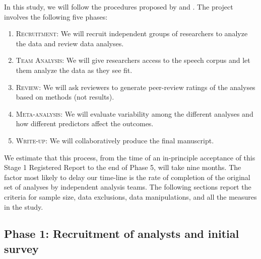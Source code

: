 \documentclass[Review,times,sageh]{sagej}
\providecommand{\tightlist}{\setlength{\itemsep}{0pt}\setlength{\parskip}{0pt}}
\begin{document}
In this study, we will follow the procedures proposed by \citet{Parker2020} and \citet{aczel2021}.
The project involves the following five phases:

\begin{enumerate}
\def\labelenumi{\arabic{enumi}.}
\tightlist
\item
  \textsc{Recruitment}: We will recruit independent groups of researchers to analyze the data and review data analyses.
\item
  \textsc{Team Analysis}: We will give researchers access to the speech corpus and let them analyze the data as they see fit.
\item
  \textsc{Review}: We will ask reviewers to generate peer-review ratings of the analyses based on methods (not results).
\item
  \textsc{Meta-analysis}: We will evaluate variability among the different analyses and how different predictors affect the outcomes.
\item
  \textsc{Write-up}: We will collaboratively produce the final manuscript.
\end{enumerate}

We estimate that this process, from the time of an in-principle acceptance of this Stage 1 Registered Report to the end of Phase 5, will take nine months.
The factor most likely to delay our time-line is the rate of completion of the original set of analyses by independent analysis teams.
The following sections report the criteria for sample size, data exclusions, data manipulations, and all the measures in the study.

\hypertarget{phase-1-recruitment-of-analysts-and-initial-survey}{%
\subsection{Phase 1: Recruitment of analysts and initial survey}\label{phase-1-recruitment-of-analysts-and-initial-survey}}
\end{document}

